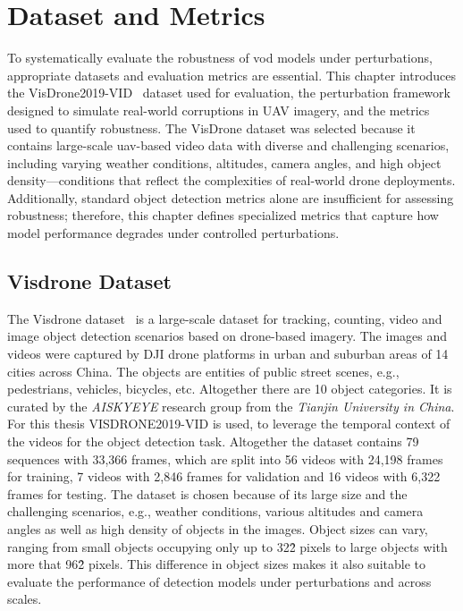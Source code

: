\documentclass[final,twoside]{vutinfth}
\begin{document}
\chapter{Dataset and Metrics}
To systematically evaluate the robustness of \gls{vod} models under perturbations, appropriate datasets and evaluation metrics are essential.
This chapter introduces the VisDrone2019-VID~\cite{zhu2021detection} dataset used for evaluation, the perturbation framework designed to simulate real-world corruptions in UAV imagery, and the metrics used to quantify robustness.
The VisDrone dataset was selected because it contains large-scale \gls{uav}-based video data with diverse and challenging scenarios, including varying weather conditions, altitudes, camera angles, and high object density—conditions that reflect the complexities of real-world drone deployments.
Additionally, standard object detection metrics alone are insufficient for assessing robustness; therefore, this chapter defines specialized metrics that capture how model performance degrades under controlled perturbations.

\section{Visdrone Dataset}
The Visdrone dataset~\cite{zhu2021detection} is a large-scale dataset for tracking, counting, video and image object detection scenarios based on drone-based imagery.
The images and videos were captured by DJI drone platforms in urban and suburban areas of 14 cities across China.
The objects are entities of public street scenes, e.g., pedestrians, vehicles, bicycles, etc.
Altogether there are 10 object categories.
It is curated by the \emph{AISKYEYE} research group from the \emph{Tianjin University in China}.
For this thesis VISDRONE2019-VID is used, to leverage the temporal context of the videos for the object detection task. 
Altogether the dataset contains 79 sequences with 33,366 frames, which are split into 56 videos with 24,198 frames for training, 7 videos with 2,846 frames for validation and 16 videos with 6,322 frames for testing.
The dataset is chosen because of its large size and the challenging scenarios, e.g., weather conditions, various altitudes and camera angles as well as high density of objects in the images.
Object sizes can vary, ranging from small objects occupying only up to 32\^2 pixels to large objects with more that 96\^2 pixels.
This difference in object sizes makes it also suitable to evaluate the performance of detection models under perturbations and across scales.
\end{document}
